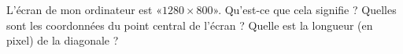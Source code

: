 
\begin{exercice}\label{exoSeconde-0004}

    L'écran de mon ordinateur est «\( 1280\times 800\)». Qu'est-ce que cela signifie ? Quelles sont les coordonnées du point central de l'écran ? Quelle est la longueur (en pixel) de la diagonale ?

\end{exercice}
